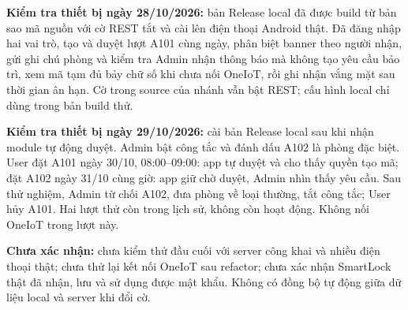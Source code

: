 \documentclass[12pt,a4paper]{article}
\begin{document}
\textbf{Kiểm tra thiết bị ngày 28/10/2026:} bản Release local đã được build từ bản sao mã nguồn với cờ REST tắt và cài lên điện thoại Android thật. Đã đăng nhập hai vai trò, tạo và duyệt lượt A101 cùng ngày, phân biệt banner theo người nhận, gửi ghi chú phòng và kiểm tra Admin nhận thông báo mà không tạo yêu cầu bảo trì, xem mã tạm đủ bảy chữ số khi chưa nối OneIoT, rồi ghi nhận vắng mặt sau thời gian ân hạn. Cờ trong source của nhánh vẫn bật REST; cấu hình local chỉ dùng trong bản build thử.

\textbf{Kiểm tra thiết bị ngày 29/10/2026:} cài bản Release local sau khi nhận module tự động duyệt. Admin bật công tắc và đánh dấu A102 là phòng đặc biệt. User đặt A101 ngày 30/10, 08:00--09:00: app tự duyệt và cho thấy quyền tạo mã; đặt A102 ngày 31/10 cùng giờ: app giữ chờ duyệt, Admin nhìn thấy yêu cầu. Sau thử nghiệm, Admin từ chối A102, đưa phòng về loại thường, tắt công tắc; User hủy A101. Hai lượt thử còn trong lịch sử, không còn hoạt động. Không nối OneIoT trong lượt này.

\textbf{Chưa xác nhận:} chưa kiểm thử đầu cuối với server công khai và nhiều điện thoại thật; chưa thử lại kết nối OneIoT sau refactor; chưa xác nhận SmartLock thật đã nhận, lưu và sử dụng được mật khẩu. Không có đồng bộ tự động giữa dữ liệu local và server khi đổi cờ.
\end{document}
